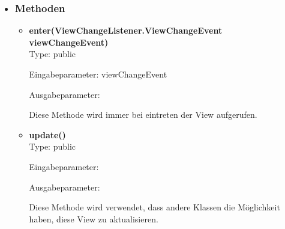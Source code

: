 \begin{itemize}
\item \subsubsection{Methoden}
\begin{itemize}
\item \textbf{enter(ViewChangeListener.ViewChangeEvent viewChangeEvent)}\hfill\\
Type: public

Eingabeparameter: viewChangeEvent

Ausgabeparameter:

Diese Methode wird immer bei eintreten der View aufgerufen.



\item \textbf{update()} \hfill\\ 
Type: public

Eingabeparameter:

Ausgabeparameter:

Diese Methode wird verwendet, dass andere Klassen die Möglichkeit haben, diese View zu aktualisieren.
\end{itemize}

\end{itemize}